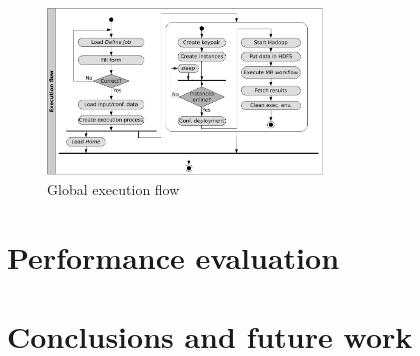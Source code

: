 \documentclass{sig-alternate}
\begin{document}
\begin{figure}[tbp]
\centering
\includegraphics[width=0.65\textwidth]{img/006}
\caption{Global execution flow}
\label{fig:exflow}
\end{figure}



\section{Performance evaluation}\label{sec:performance}
\noindent


\section{Conclusions and future work}\label{sec:conclusions}
\noindent





\appendix
\end{document}
